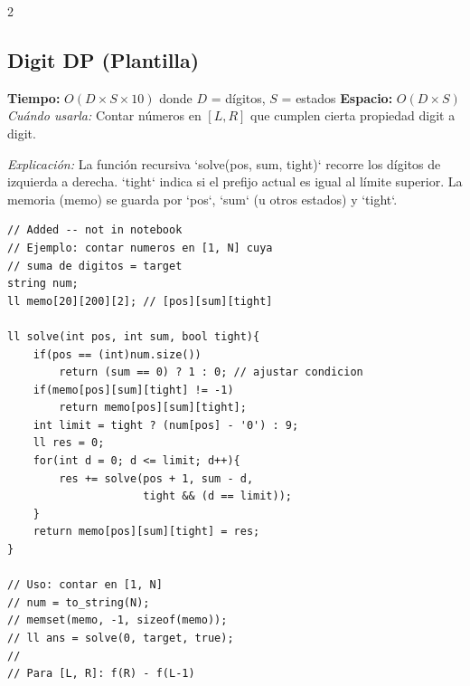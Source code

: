 \documentclass[10pt,a4paper]{article}
\begin{document}
\begin{multicols}{2}
\subsection{Digit DP (Plantilla)}
\textbf{Tiempo:} $O(D \times S \times 10)$ donde $D$ = d\'igitos, $S$ = estados \quad \textbf{Espacio:} $O(D \times S)$\\
\textit{Cu\'ando usarla:} Contar n\'umeros en $[L, R]$ que cumplen cierta propiedad digit a digit.

\textit{Explicación:} La función recursiva `solve(pos, sum, tight)` recorre los dígitos de izquierda a derecha. `tight` indica si el prefijo actual es igual al límite superior. La memoria (memo) se guarda por `pos`, `sum` (u otros estados) y `tight`.

\begin{lstlisting}
// Added -- not in notebook
// Ejemplo: contar numeros en [1, N] cuya
// suma de digitos = target
string num;
ll memo[20][200][2]; // [pos][sum][tight]

ll solve(int pos, int sum, bool tight){
    if(pos == (int)num.size())
        return (sum == 0) ? 1 : 0; // ajustar condicion
    if(memo[pos][sum][tight] != -1)
        return memo[pos][sum][tight];
    int limit = tight ? (num[pos] - '0') : 9;
    ll res = 0;
    for(int d = 0; d <= limit; d++){
        res += solve(pos + 1, sum - d,
                     tight && (d == limit));
    }
    return memo[pos][sum][tight] = res;
}

// Uso: contar en [1, N]
// num = to_string(N);
// memset(memo, -1, sizeof(memo));
// ll ans = solve(0, target, true);
//
// Para [L, R]: f(R) - f(L-1)
\end{lstlisting}

\end{multicols}
\newpage

\end{document}
